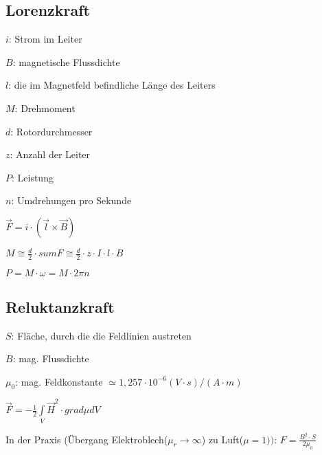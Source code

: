 \documentclass[german]{latex4ei/latex4ei_sheet}
\begin{document}
\begin{sectionbox}
				\subsection{Lorenzkraft}
					\begin{bluebox}
						\item $i$: Strom im Leiter
						\item $B$: magnetische Flussdichte
						\item $l$: die im Magnetfeld befindliche Länge des Leiters
						\item $M$: Drehmoment
						\item $d$: Rotordurchmesser
						\item $z$: Anzahl der Leiter
						\item $P$: Leistung
						\item $n$: Umdrehungen pro Sekunde
						\item $\vec{F} = i\cdot (\vec{l}\times \vec{B})$
						\item $M \cong  \frac{d}{2}\cdot sum F \cong \frac{d}{2}\cdot z\cdot I\cdot l \cdot B$
						\item $P = M \cdot \omega = M \cdot 2\pi n$
					\end{bluebox}
				\subsection{Reluktanzkraft}
					\begin{symbolbox}
						\item $S$: Fläche, durch die die Feldlinien austreten
						\item $B$: mag. Flussdichte
						\item $\mu_0$: mag. Feldkonstante $\simeq 1,257\cdot 10^{-6}(V\cdot s)/(A\cdot m)$
						\item $\vec{F} = -\frac{1}{2}\int\limits_V \vec{H}^2 \cdot grad \mu dV$
						\item In der Praxis (Übergang Elektroblech($\mu_r \rightarrow\infty$) zu Luft($\mu =  1))$: $F = \frac{B^2\cdot S}{2\mu_0}$
					\end{symbolbox}
				\end{sectionbox}
\end{document}
